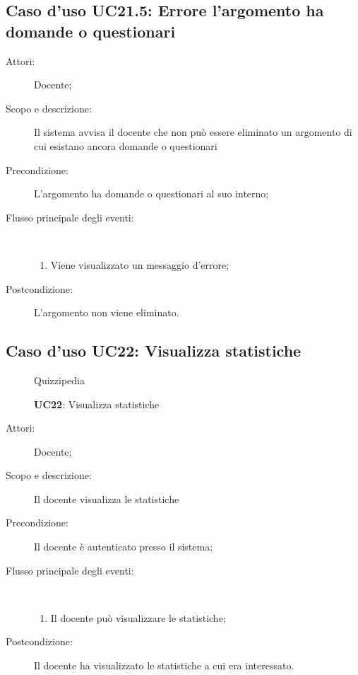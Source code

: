 \subsection{Caso d'uso UC21.5: Errore l'argomento ha domande o questionari}\begin{description}
	\item[Attori:] Docente;
	\item[Scopo e descrizione:] Il sistema avvisa il docente che non può essere eliminato un argomento di cui esistano ancora domande o questionari
	\item[Precondizione:] L'argomento ha domande o questionari al suo interno;
	
	\item[Flusso principale degli eventi:] \ 
	\begin{enumerate}
		\item Viene visualizzato un messaggio d'errore;
		
	\end{enumerate}
	\item[Postcondizione:] L'argomento non viene eliminato.
\end{description}
\hypertarget{UC22}{}
\subsection{Caso d'uso UC22: Visualizza statistiche}
\begin{figure}[H]
	\centering
	\begin{resizedtikzpicture}{\textwidth}
		\begin{umlsystem}[x=0, fill=lightgray!20]{Quizzipedia}
			\umlassoc{Docente}{10}
			\umlinherit{13}{10}
			\umlinherit{12}{10}
			\umlinherit{11}{10}
		\end{umlsystem}
	\end{resizedtikzpicture}
	\caption{\textbf{UC22}: Visualizza statistiche}
	\label{UC22}
\end{figure}
\begin{description}
	\item[Attori:] Docente;
	\item[Scopo e descrizione:] Il docente visualizza le statistiche
	\item[Precondizione:] Il docente è autenticato presso il sistema;
	
	\item[Flusso principale degli eventi:] \ 
	\begin{enumerate}
		\item Il docente può visualizzare le statistiche;
		
	\end{enumerate}
	\item[Postcondizione:] Il docente ha visualizzato le statistiche a cui era interessato.
\end{description}
\hypertarget{UC23}{}
